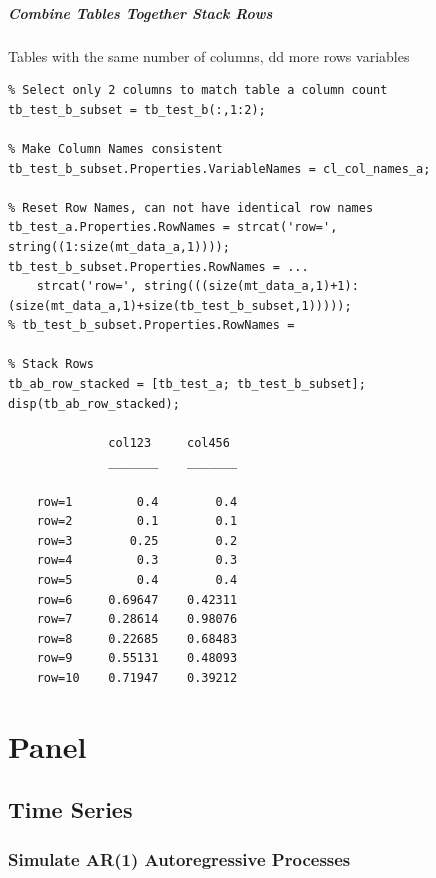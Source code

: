 \documentclass[
]{book}
\begin{document}
\hypertarget{combine-tables-together-stack-rows-1}{%
\paragraph{Combine Tables Together Stack Rows}\label{combine-tables-together-stack-rows-1}}

Tables with the same number of columns, dd more rows variables

\begin{verbatim}
% Select only 2 columns to match table a column count
tb_test_b_subset = tb_test_b(:,1:2);

% Make Column Names consistent
tb_test_b_subset.Properties.VariableNames = cl_col_names_a;

% Reset Row Names, can not have identical row names
tb_test_a.Properties.RowNames = strcat('row=', string((1:size(mt_data_a,1))));
tb_test_b_subset.Properties.RowNames = ...
    strcat('row=', string(((size(mt_data_a,1)+1):(size(mt_data_a,1)+size(tb_test_b_subset,1)))));
% tb_test_b_subset.Properties.RowNames =

% Stack Rows
tb_ab_row_stacked = [tb_test_a; tb_test_b_subset];
disp(tb_ab_row_stacked);

              col123     col456 
              _______    _______

    row=1         0.4        0.4
    row=2         0.1        0.1
    row=3        0.25        0.2
    row=4         0.3        0.3
    row=5         0.4        0.4
    row=6     0.69647    0.42311
    row=7     0.28614    0.98076
    row=8     0.22685    0.68483
    row=9     0.55131    0.48093
    row=10    0.71947    0.39212
\end{verbatim}

\hypertarget{panel}{%
\chapter{Panel}\label{panel}}

\hypertarget{time-series}{%
\section{Time Series}\label{time-series}}

\hypertarget{simulate-ar1-autoregressive-processes}{%
\subsection{Simulate AR(1) Autoregressive Processes}\label{simulate-ar1-autoregressive-processes}}
\end{document}
